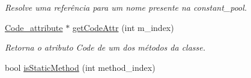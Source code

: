 \begin{DoxyCompactItemize}
\begin{DoxyCompactList}\small\item\em Resolve uma referência para um nome presente na constant\+\_\+pool. \end{DoxyCompactList}\item 
\hyperlink{attributes_8hpp_ad1d2692bc09d9023430faad186e7647e}{Code\+\_\+attribute} $\ast$ \hyperlink{classClassFile_a44dc4dbf9a22d416a9c0b8a55c997523}{get\+Code\+Attr} (int m\+\_\+index)
\begin{DoxyCompactList}\small\item\em Retorna o atributo Code de um dos métodos da classe. \end{DoxyCompactList}\item 
bool \hyperlink{classClassFile_af4cd0b727cd13354028f1c9d02a53519}{is\+Static\+Method} (int method\+\_\+index)
\end{DoxyCompactItemize}
